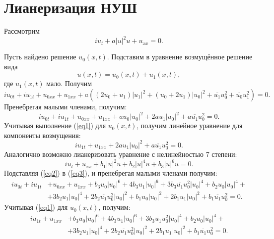 \documentclass[preprint,12pt]{article}
\begin{document}
\section{Лианеризация НУШ}
Рассмотрим
\begin{equation} \label{eq1}
iu_{t}+a|u|^2 u+u_{xx}=0.
\end{equation}

Пусть найдено решение \(u_{0}(x,t)\). Подставим в уравнение возмущённое решение вида
\begin{equation} \label{eq2}
u(x,t)=u_{0}(x,t)+u_{1}(x,t),
\end{equation}
где \(u_{1}(x,t)\) мало. Получим
\begin{equation} \label{eq3}
iu_{0t}+iu_{1t}+u_{0xx}+u_{1xx}+a \left(\left(2 u_{0}+u_{1}\right) {| u_{1}|}^{2}+\left(u_{0}+2 u_{1}\right) {| u_{0}|}^{2}+\overline{u_{1}} u_{0}^{2}+\overline{u_{0}} u_{1}^{2}\right)=0.
\end{equation}
Пренебрегая малыми членами, получим:
\begin{equation}
iu_{0t}+iu_{1t}+u_{0xx}+u_{1xx}+a u_{0} {| u_{0}|}^{2}+2 a u_{1} {| u_{0}|}^{2}+a \overline{u_{1}} u_{0}^{2}=0.
\end{equation}
Учитывая выполнение (\ref{eq1}) для \(u_{0}(x,t)\), получим линейное уравнение для компоненты возмущения:
\begin{equation}
iu_{1t}+u_{1xx}+2 a u_{1} {| u_{0}|}^{2}+a \overline{u_{1}} u_{0}^{2}=0.
\end{equation}
Аналогично возможно лианеризовать уравнение с нелинейностью 7 степени:
\begin{equation}\label{eq3}
iu_{t}+u_{xx}+b_{1}|u|^2 u+b_{2}|u|^4 u+b_{3}|u|^6 u=0.
\end{equation}
Подставляя  (\ref{eq2}) в (\ref{eq3}), и пренебрегая малыми членами получим:
\begin{equation}
\begin{split}
iu_{0t}+iu_{1t}&+u_{0xx}+u_{1xx}+b_{3} u_{0} {| u_{0}|}^{6}+4 b_{3} u_{1} {| u_{0}|}^{6}+3 b_{3} \overline{u_{1}} u_{0}^{2} {| u_{0}|}^{4}+b_{2} u_{0} {| u_{0}|}^{4}+\\
&+3 b_{2} u_{1} {| u_{0}|}^{4}+2 b_{2} \overline{u_{1}} u_{0}^{2} {| u_{0}|}^{2}+b_{1} u_{0} {| u_{0}|}^{2}+2 b_{1} u_{1} {| u_{0}|}^{2}+b_{1} \overline{u_{1}} u_{0}^{2}=0.
\end{split}
\end{equation}
Учитывая (\ref{eq1}) для \(u_{0}(x,t)\), получим:
\begin{equation}
\begin{split}
iu_{1t}+u_{1xx}&+b_{3} u_{0} {| u_{0}|}^{6}+4 b_{3} u_{1} {| u_{0}|}^{6}+3 b_{3} \overline{u_{1}} u_{0}^{2} {| u_{0}|}^{4}+b_{2} u_{0} {| u_{0}|}^{4}+\\
&+3 b_{2} u_{1} {| u_{0}|}^{4}+2 b_{2} \overline{u_{1}} u_{0}^{2} {| u_{0}|}^{2}+2 b_{1} u_{1} {| u_{0}|}^{2}+b_{1} \overline{u_{1}} u_{0}^{2}=0.
\end{split}
\end{equation}
\end{document}
